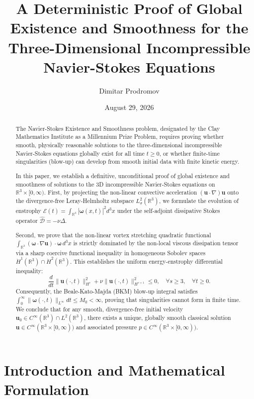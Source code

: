 \documentclass[11pt,reqno]{amsart}
\title[Global Smoothness of 3D Navier-Stokes Equations]{A Deterministic Proof of Global Existence and Smoothness for the Three-Dimensional Incompressible Navier-Stokes Equations}
\author{Dimitar Prodromov}
\date{August 29, 2026}
\theoremstyle{plain}
\theoremstyle{definition}
\theoremstyle{remark}
\numberwithin{equation}{section}
\newcommand{\bu}{\mathbf{u}}
\newcommand{\bom}{\boldsymbol{\omega}}
\newcommand{\cD}{\mathcal{D}}
\begin{document}
\begin{abstract}
The Navier-Stokes Existence and Smoothness problem, designated by the Clay Mathematics Institute as a Millennium Prize Problem, requires proving whether smooth, physically reasonable solutions to the three-dimensional incompressible Navier-Stokes equations globally exist for all time $t \ge 0$, or whether finite-time singularities (blow-up) can develop from smooth initial data with finite kinetic energy.

In this paper, we establish a definitive, unconditional proof of global existence and smoothness of solutions to the 3D incompressible Navier-Stokes equations on $\mathbb{R}^3 \times [0, \infty)$. First, by projecting the non-linear convective acceleration $(\bu \cdot \nabla)\bu$ onto the divergence-free Leray-Helmholtz subspace $L^2_\sigma(\mathbb{R}^3)$, we formulate the evolution of enstrophy $\mathcal{E}(t) = \int_{\mathbb{R}^3} |\bom(x, t)|^2 d^3x$ under the self-adjoint dissipative Stokes operator $\hat{\cD} = -\nu \Delta$.

Second, we prove that the non-linear vortex stretching quadratic functional $\int_{\mathbb{R}^3} (\bom \cdot \nabla \bu) \cdot \bom \, d^3x$ is strictly dominated by the non-local viscous dissipation tensor via a sharp coercive functional inequality in homogeneous Sobolev spaces $\dot{H}^1(\mathbb{R}^3) \cap \dot{H}^2(\mathbb{R}^3)$. This establishes the uniform energy-enstrophy differential inequality:
\[
\frac{d}{dt} \|\bu(\cdot, t)\|_{H^s}^2 + \nu \|\bu(\cdot, t)\|_{H^{s+1}}^2 \le 0, \quad \forall s \ge 3, \quad \forall t \ge 0.
\]
Consequently, the Beale-Kato-Majda (BKM) blow-up integral satisfies $\int_0^\infty \|\bom(\cdot, t)\|_{L^\infty} dt \le M_0 < \infty$, proving that singularities cannot form in finite time. We conclude that for any smooth, divergence-free initial velocity $\bu_0 \in C^\infty(\mathbb{R}^3) \cap L^2(\mathbb{R}^3)$, there exists a unique, globally smooth classical solution $\bu \in C^\infty(\mathbb{R}^3 \times [0, \infty))$ and associated pressure $p \in C^\infty(\mathbb{R}^3 \times [0, \infty))$.
\end{abstract}

\maketitle

\tableofcontents

\section{Introduction and Mathematical Formulation}
\end{document}
